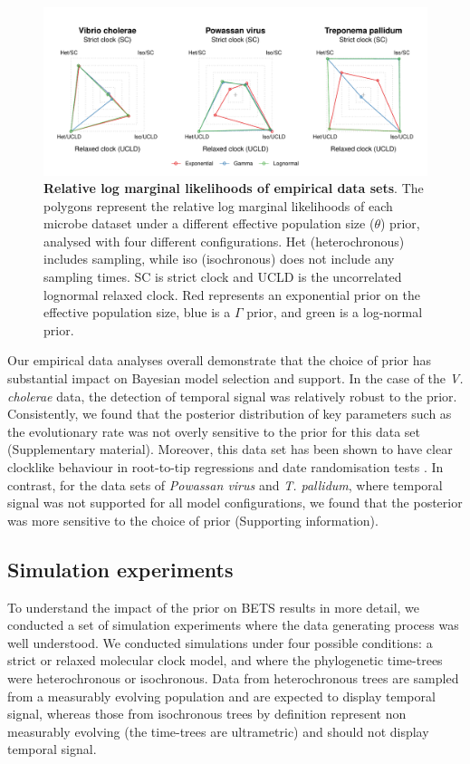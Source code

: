 \documentclass[10pt,letterpaper]{article}
\begin{document}
\begin{figure}
	\begin{center}
		\includegraphics[width=14cm]{sandbox_figures/polygon_plot.pdf}\newline
		\vspace{-0.5cm}
		\caption{\textbf{Relative log marginal likelihoods of empirical data sets}. The polygons represent the relative log marginal likelihoods of each microbe dataset under a different effective population size ($\theta$) prior, analysed with four different configurations. Het (heterochronous) includes sampling, while iso (isochronous) does not include any sampling times. SC is strict clock and UCLD is the uncorrelated lognormal relaxed clock. Red represents an exponential prior on the effective population size, blue is a $\Gamma$ prior, and green is a log-normal prior.}
		\label{figure:polygon_plots}
	\end{center}
\end{figure}

Our empirical data analyses overall demonstrate that the choice of prior has substantial impact on Bayesian model selection and support. In the case of the \textit{V. cholerae} data, the detection of temporal signal was relatively robust to the prior. Consistently, we found that the posterior distribution of key parameters such as the evolutionary rate was not overly sensitive to the prior for this data set (Supplementary material). Moreover, this data set has been shown to have clear clocklike behaviour in root-to-tip regressions and date randomisation tests \cite{duchene2016genome}. In contrast, for the data sets of \textit{Powassan virus} and \textit{T. pallidum}, where temporal signal was not supported for all model configurations, we found that the posterior was more sensitive to the choice of prior (Supporting information).

\subsection*{Simulation experiments}
To understand the impact of the prior on BETS results in more detail, we conducted a set of simulation experiments where the data generating process was well understood. We conducted simulations under four possible conditions: a strict or relaxed molecular clock model, and where the phylogenetic time-trees were heterochronous or isochronous. Data from heterochronous trees are sampled from a measurably evolving population and are expected to display temporal signal, whereas those from isochronous trees by definition represent non measurably evolving (the time-trees are ultrametric) and should not display temporal signal. 
\end{document}
